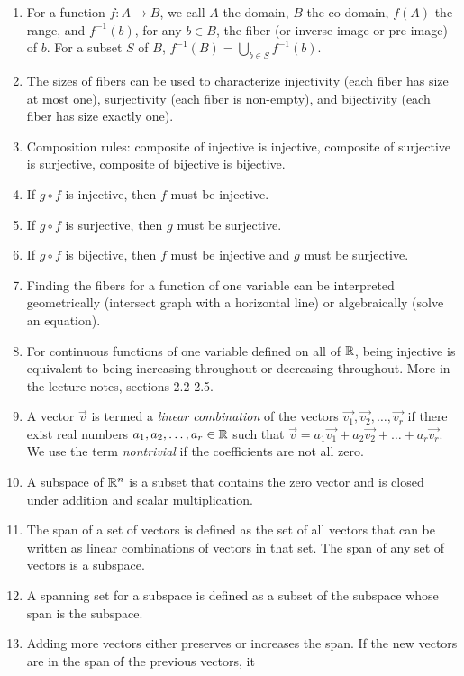 \documentclass[10pt]{amsart}
\begin{document}
\begin{enumerate}
\item For a function $f:A \to B$, we call $A$ the domain, $B$ the
  co-domain, $f(A)$ the range, and $f^{-1}(b)$, for any $b \in B$, the
  fiber (or inverse image or pre-image) of $b$. For a subset $S$ of
  $B$, $f^{-1}(B) = \bigcup_{b \in S} f^{-1}(b)$.
\item The sizes of fibers can be used to characterize injectivity
  (each fiber has size at most one), surjectivity (each fiber is
  non-empty), and bijectivity (each fiber has size exactly one).
\item Composition rules: composite of injective is injective,
  composite of surjective is surjective, composite of bijective is
  bijective.
\item If $g \circ f$ is injective, then $f$ must be injective.
\item If $g \circ f$ is surjective, then $g$ must be surjective.
\item If $g \circ f$ is bijective, then $f$ must be injective and $g$
  must be surjective.
\item Finding the fibers for a function of one variable can be
  interpreted geometrically (intersect graph with a horizontal line)
  or algebraically (solve an equation).
\item For continuous functions of one variable defined on all of $\mathbb{R}$,
  being injective is equivalent to being increasing throughout or
  decreasing throughout. More in the lecture notes, sections 2.2-2.5.
\item A vector $\vec{v}$ is termed a {\em linear combination} of the
  vectors $\vec{v_1}, \vec{v_2}, \dots, \vec{v_r}$ if there exist real
  numbers $a_1,a_2,\dots,a_r \in \mathbb{R}$ such that $\vec{v} = a_1\vec{v_1}
  + a_2\vec{v_2} + \dots + a_r\vec{v_r}$. We use the term {\em
    nontrivial} if the coefficients are not all zero.
\item A subspace of $\mathbb{R}^n$ is a subset that contains the zero vector
  and is closed under addition and scalar multiplication.
\item The span of a set of vectors is defined as the set of all
  vectors that can be written as linear combinations of vectors in
  that set. The span of any set of vectors is a subspace.
\item A spanning set for a subspace is defined as a subset of the
  subspace whose span is the subspace.
\item Adding more vectors either preserves or increases the span. If
  the new vectors are in the span of the previous vectors, it

\end{enumerate}
\end{document}
